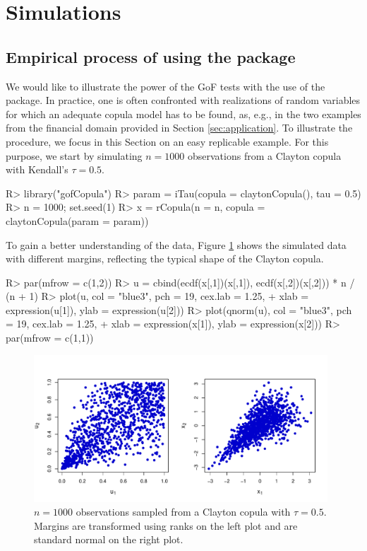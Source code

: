 \section{Simulations}
\label{sec:simulation_study}
\subsection{Empirical process of using the package}\label{sec:empirical_process_sim}
We would like to illustrate the power of the GoF tests with the use of the  package. In practice, one is often confronted with realizations of random variables for which an adequate copula model has to be found, as, e.g., in the two examples from the financial domain provided in Section \ref{sec:application}.
To illustrate the procedure, we focus in this Section on an easy replicable example. For this purpose, we start by simulating $n = 1000$ observations from a Clayton copula with Kendall's $\tau = 0.5$.
\mycolor
\begin{example}
R> library("gofCopula")
R> param = iTau(copula = claytonCopula(), tau = 0.5)
R> n = 1000; set.seed(1)
R> x = rCopula(n = n, copula = claytonCopula(param = param))
\end{example}
To gain a better understanding of the data, Figure \ref{Sim_Clayton_Plot_Sec_5} shows the simulated data with different margins, reflecting the typical shape of the Clayton copula.

\begin{example}
R> par(mfrow = c(1,2))
R> u = cbind(ecdf(x[,1])(x[,1]), ecdf(x[,2])(x[,2])) * n / (n + 1)
R> plot(u, col = "blue3", pch = 19, cex.lab = 1.25, 
+       xlab = expression(u[1]), ylab = expression(u[2]))
R> plot(qnorm(u), col = "blue3", pch = 19, cex.lab = 1.25,
+       xlab = expression(x[1]), ylab = expression(x[2]))
R> par(mfrow = c(1,1))
\end{example}
\vspace{-0.7cm}
\begin{figure}[H]
	\centering
 \includegraphics[width=110mm]{img/Simulated_Example.pdf}
	\caption{$n = 1000$ observations sampled from a Clayton copula with $\tau = 0.5$. \mycolor Margins are transformed using ranks on the left plot and are standard normal on the right plot. \bk}
	\label{Sim_Clayton_Plot_Sec_5}
\end{figure}

